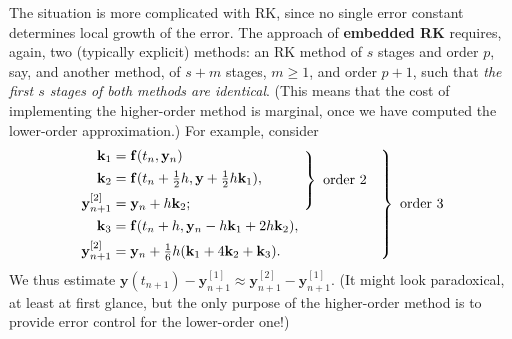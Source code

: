 \documentclass[a4paper]{article}
\begin{document}
\begin{technique}
    The situation is more complicated with RK, since no single error constant determines local growth of the error. The approach of \textbf{embedded RK} requires, again, two (typically explicit) methods: an RK method of $s$ stages and order $p$, say, and another method, of $s+m$ stages, $m \geq 1$, and order $p+1$, such that \textit{the first $s$ stages of both methods are identical}. (This means that the cost of implementing the higher-order method is marginal, once we have computed the lower-order approximation.) For example, consider
    \[
        \begin{rcases}
            \begin{rcases}
            \begin{aligned}
                \mathbf{k}_1 &= \mathbf{f}(t_n, \mathbf{y}_n)\\ 
                \mathbf{k}_2 &= \mathbf{f}( t_n + \tfrac{1}{2}h, \mathbf{y} + \tfrac{1}{2} h \mathbf{k}_1),\hspace*{3em}\\ 
                \mathbf{y}^{[2]}_{n+1} &= \mathbf{y}_n + h \mathbf{k}_2;
            \end{aligned}
            \end{rcases} \text{ order }2\hspace*{1em}\\
            \hspace{1.1pt}
            \begin{aligned}
                \mathbf{k}_3 &= \mathbf{f}(t_n + h, \mathbf{y}_n - h \mathbf{k}_1 + 2h \mathbf{k}_2),\\ 
                \mathbf{y}^{[2]}_{n+1} &= \mathbf{y}_n + \tfrac{1}{6} h (\mathbf{k}_1 + 4 \mathbf{k}_2 + \mathbf{k}_3).
            \end{aligned}
        \end{rcases}\text{ order }3
    \]
    We thus estimate $\mathbf{y}\left(t_{n+1}\right)-\mathbf{y}_{n+1}^{[1]} \approx \mathbf{y}_{n+1}^{[2]}-\mathbf{y}_{n+1}^{[1]}$. (It might look paradoxical, at least at first glance, but the only purpose of the higher-order method is to provide error control for the lower-order one!)
\end{technique}
\end{document}
